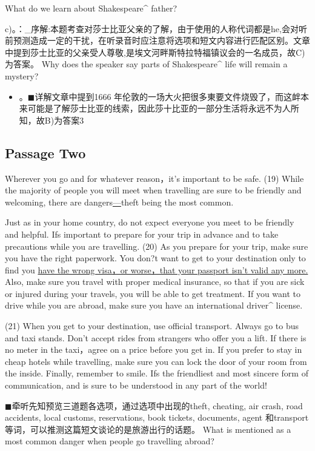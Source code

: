 \documentclass[UTF8,11pt]{ctexart}
\begin{document}
What do we learn about Shakespeare\textasciicircum{} father?


c)。：\_序解:本题考查对莎士比亚父亲的了解，由于使用的人称代词都是he,会对听前预测造成一定的干扰，在听录音时应注意将选项和短文内容进行匹配区别。文章中提到莎士比亚的父亲受人尊敬,是埃文河畔斯特拉特福镇议会的一名成员，故C)为答案。 Why does the speaker say parts of Shakespeare\textasciicircum{} life will remain a mystery?


\begin{itemize}[leftmargin=2em,itemsep=.2em,topsep=.4em]\item[B.] 。\(\blacksquare\)详解文章中提到1666 年伦敦的一场大火把很多東要文件烧毁了，而这衅本来可能是了解莎士比亚的线索，因此莎十比亚的一部分生活将永远不为人所知，故B)为答案3
\end{itemize}

\subsection*{Passage Two}


Wherever you go and for whatever reason，it’s important to be safe. (19) While the majority of people you will meet when travelling are sure to be friendly and welcoming, there are dangers\uline{—}theft being the most common.


Just as in your home country, do not expect everyone you meet to be friendly and helpful. Ifs important to prepare for your trip in advance and to take precautions while you are travelling. (20) As you prepare for your trip, make sure you have the right paperwork. You don?t want to get to your destination only to find you \uline{have the wrong visa，or worse，that your passport isn’t valid any more.} Also, make sure you travel with proper medical insurance, so that if you are sick or injured during your travels, you will be able to get treatment. If you want to drive while you are abroad, make sure you have an international driver\textasciicircum{} license.


(21) When you get to your destination, use official transport. Always go to bus and taxi stands. Don’t accept rides from strangers who offer you a lift. If there is no meter in the taxi，agree on a price before you get in. If you prefer to stay in cheap hotels while travelling, make sure you can lock the door of your room from the inside. Finally, remember to smile. Ifs the friendliest and most sincere form of communication, and is sure to be understood in any part of the world!


\(\blacksquare\)牵听先知预览三道题各选项，通过选项中出现的theft, cheating, air crash, road accidents, local customs, reservations, book tickets, documents, agent 和transport 等词，可以推测这篇短文谈论的是旅游出行的话题。 What is mentioned as a most common danger when people go travelling abroad?
\end{document}
